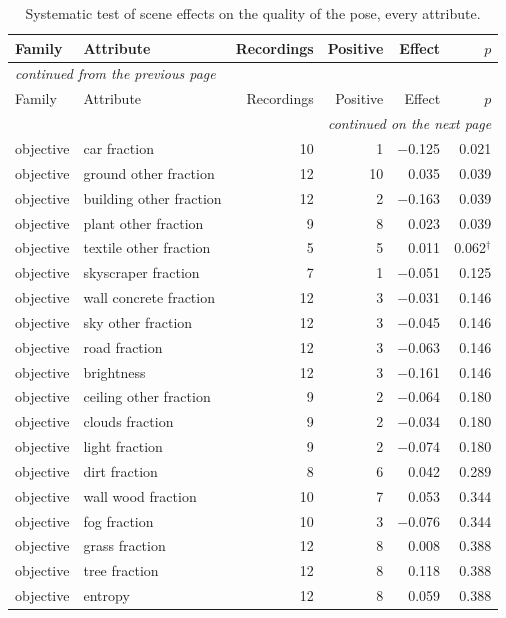 \documentclass[11pt,a4paper]{article}
\begin{document}
\begin{longtable}{llrrrr}
\caption{Systematic test of scene effects on the quality of the pose, every attribute.}\label{tab:S2}\\
\toprule
Family & Attribute & Recordings & Positive & Effect & $p$ \\
\midrule
\endfirsthead
\multicolumn{6}{l}{\footnotesize\itshape continued from the previous page}\\
\toprule
Family & Attribute & Recordings & Positive & Effect & $p$ \\
\midrule
\endhead
\midrule
\multicolumn{6}{r}{\footnotesize\itshape continued on the next page}\\
\endfoot
\bottomrule
\endlastfoot
objective & car fraction & 10 & 1 & $-$0.125 & 0.021 \\
objective & ground other fraction & 12 & 10 & 0.035 & 0.039 \\
objective & building other fraction & 12 & 2 & $-$0.163 & 0.039 \\
objective & plant other fraction & 9 & 8 & 0.023 & 0.039 \\
objective & textile other fraction & 5 & 5 & 0.011 & 0.062$^{\dagger}$ \\
objective & skyscraper fraction & 7 & 1 & $-$0.051 & 0.125 \\
objective & wall concrete fraction & 12 & 3 & $-$0.031 & 0.146 \\
objective & sky other fraction & 12 & 3 & $-$0.045 & 0.146 \\
objective & road fraction & 12 & 3 & $-$0.063 & 0.146 \\
objective & brightness & 12 & 3 & $-$0.161 & 0.146 \\
objective & ceiling other fraction & 9 & 2 & $-$0.064 & 0.180 \\
objective & clouds fraction & 9 & 2 & $-$0.034 & 0.180 \\
objective & light fraction & 9 & 2 & $-$0.074 & 0.180 \\
objective & dirt fraction & 8 & 6 & 0.042 & 0.289 \\
objective & wall wood fraction & 10 & 7 & 0.053 & 0.344 \\
objective & fog fraction & 10 & 3 & $-$0.076 & 0.344 \\
objective & grass fraction & 12 & 8 & 0.008 & 0.388 \\
objective & tree fraction & 12 & 8 & 0.118 & 0.388 \\
objective & entropy & 12 & 8 & 0.059 & 0.388 \\

\end{longtable}
\end{document}
